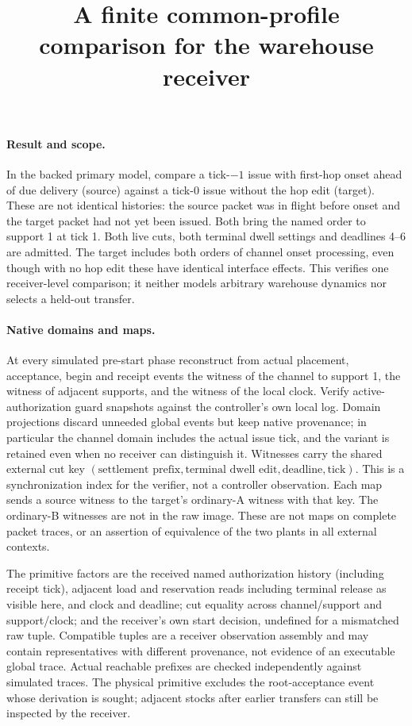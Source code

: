 \documentclass{article}
\title{A finite common-profile comparison for the warehouse receiver}
\date{}
\begin{document}
\maketitle

\paragraph{Result and scope.} In the backed primary model, compare a tick-$-1$ issue with first-hop onset ahead of due delivery (source) against a tick-0 issue without the hop edit (target). These are not identical histories: the source packet was in flight before onset and the target packet had not yet been issued. Both bring the named order to support 1 at tick 1. Both live cuts, both terminal dwell settings and deadlines 4--6 are admitted. The target includes both orders of channel onset processing, even though with no hop edit these have identical interface effects. This verifies one receiver-level comparison; it neither models arbitrary warehouse dynamics nor selects a held-out transfer.

\paragraph{Native domains and maps.} At every simulated pre-start phase reconstruct from actual placement, acceptance, begin and receipt events the witness of the channel to support 1, the witness of adjacent supports, and the witness of the local clock. Verify active-authorization guard snapshots against the controller's own local log. Domain projections discard unneeded global events but keep native provenance; in particular the channel domain includes the actual issue tick, and the variant is retained even when no receiver can distinguish it. Witnesses carry the shared external cut key $(\text{settlement prefix},\text{terminal dwell edit},\text{deadline},\text{tick})$. This is a synchronization index for the verifier, not a controller observation. Each map sends a source witness to the target's ordinary-A witness with that key. The ordinary-B witnesses are not in the raw image. These are not maps on complete packet traces, or an assertion of equivalence of the two plants in all external contexts.

The primitive factors are the received named authorization history (including receipt tick), adjacent load and reservation reads including terminal release as visible here, and clock and deadline; cut equality across channel/support and support/clock; and the receiver's own start decision, undefined for a mismatched raw tuple. Compatible tuples are a receiver observation assembly and may contain representatives with different provenance, not evidence of an executable global trace. Actual reachable prefixes are checked independently against simulated traces. The physical primitive excludes the root-acceptance event whose derivation is sought; adjacent stocks after earlier transfers can still be inspected by the receiver.
\end{document}
